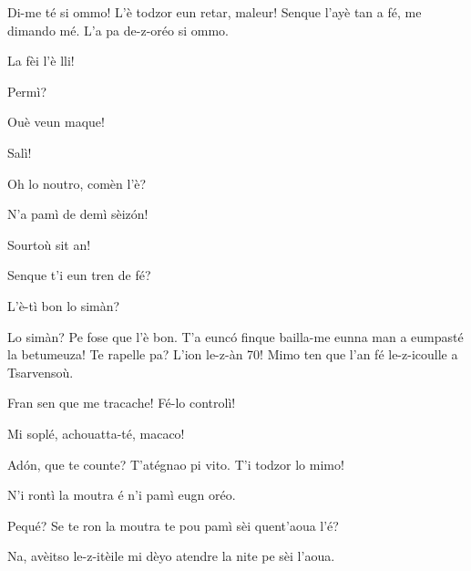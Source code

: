 
\DramPer

\act[Acte I]

\ridoiver




\begin{drama}

\Vioupspeaks{} Di-me té si ommo! L'è todzor eun retar, maleur! Senque l'ayè tan a fé, me dimando mé. L'a pa de-z-oréo si ommo.

			
\Vioupspeaks La fèi l'è lli!			
			
\Vioujspeaks {} Permì?

\Vioupspeaks Ouè veun maque!

\Vioujspeaks Salì!


\Vioupspeaks Oh lo noutro, comèn l'è?

\Vioujspeaks N'a pamì de demì sèiz\'on!

\Vioupspeaks Sourtoù sit an!


\Vioupspeaks Senque t'i eun tren de fé?

\Vioujspeaks L’è-tì bon lo simàn?

\Vioupspeaks Lo simàn? Pe fose que l'è bon. T'a eunc\'o finque bailla-me eunna man a eumpasté la betumeuza! Te rapelle pa? L'ion le-z-àn 70! Mimo ten que l'an fé le-z-icoulle a Tsarvensoù.

\Vioujspeaks Fran sen que me tracache! Fé-lo controlì! 

\Vioupspeaks Mi soplé, achouatta-té, macaco!


\Vioupspeaks Ad\'on, que te counte? T'atégnao pi vito. T'i todzor lo mimo!

\Vioujspeaks N'i rontì la moutra é n'i pamì eugn oréo.

\Vioupspeaks Pequé? Se te ron la moutra te pou pamì sèi quent'aoua l'é?

\Vioujspeaks Na, avèitso le-z-itèile mi dèyo atendre la nite pe sèi l'aoua.


\end{drama}

